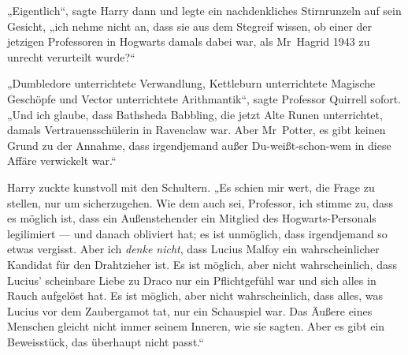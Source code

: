 „Eigentlich“, sagte Harry dann und legte ein nachdenkliches Stirnrunzeln auf sein Gesicht, „ich nehme nicht an, dass sie aus dem Stegreif wissen, ob einer der jetzigen Professoren in Hogwarts damals dabei war, als Mr~Hagrid 1943 zu unrecht verurteilt wurde?“

„Dumbledore unterrichtete Verwandlung, Kettleburn unterrichtete Magische Geschöpfe und Vector unterrichtete Arithmantik“, sagte Professor Quirrell sofort.
„Und ich glaube, dass Bathsheda Babbling, die jetzt Alte Runen unterrichtet, damals Vertrauensschülerin in Ravenclaw war. Aber Mr~Potter, es gibt keinen Grund zu der Annahme, dass irgendjemand außer Du-weißt-schon-wem in diese Affäre verwickelt war.“

Harry zuckte kunstvoll mit den Schultern.
„Es schien mir wert, die Frage zu stellen, nur um sicherzugehen. Wie dem auch sei, Professor, ich stimme zu, dass es möglich ist, dass ein Außenstehender ein Mitglied des Hogwarts-Personals legilimiert — und danach obliviert hat; es ist unmöglich, dass irgendjemand so etwas vergisst. Aber ich \emph{denke nicht}, dass Lucius Malfoy ein wahrscheinlicher Kandidat für den Drahtzieher ist. Es ist möglich, aber nicht wahrscheinlich, dass Lucius’ scheinbare Liebe zu Draco nur ein Pflichtgefühl war und sich alles in Rauch aufgelöst hat. Es ist möglich, aber nicht wahrscheinlich, dass alles, was Lucius vor dem Zaubergamot tat, nur ein Schauspiel war. Das Äußere eines Menschen gleicht nicht immer seinem Inneren, wie sie sagten. Aber es gibt ein Beweisstück, das überhaupt nicht passt.“

